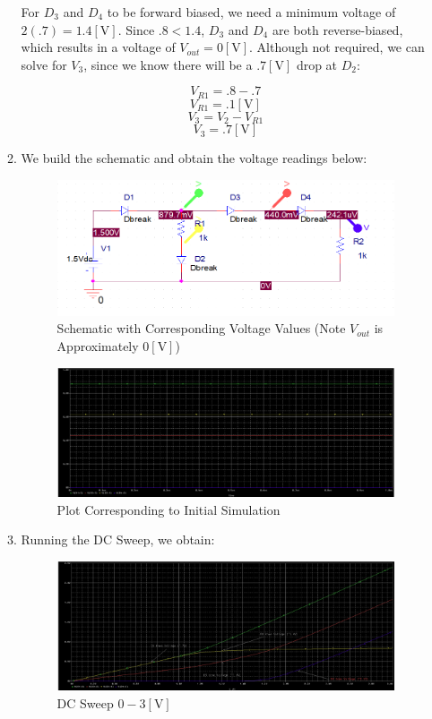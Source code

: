 \begin{enumerate}
\begin{enumerate}
        For $D_3$ and $D_4$ to be forward biased, we need a minimum voltage of $2(.7)=1.4[\si{\volt}]$. Since $.8<1.4$, $D_3$ and $D_4$ are both reverse-biased, which results in a voltage of $\boxed{V_{out}=0[\si{\volt}]}$. Although not required, we can solve for $V_3$, since we know there will be a $.7[\si{\volt}]$ drop at $D_2$:

        $$V_{R1}=.8-.7$$
        $$V_{R1}=.1[\si{\volt}]$$
        $$V_3=V_2-V_{R1}$$
        $$\boxed{V_3=.7[\si{\volt}]}$$

      \item We build the schematic and obtain the voltage readings below:

        \begin{figure}[H]
          \centering
          \includegraphics[width=.9\textwidth]{Figures/HW3Schem.png}
          \caption{Schematic with Corresponding Voltage Values (Note $V_{out}$ is Approximately $0[\si{\volt}]$)}
          \label{fig:4}
        \end{figure}

        \begin{figure}[H]
          \centering
          \includegraphics[width=.9\textwidth]{Figures/HW3-b.png}
          \caption{Plot Corresponding to Initial Simulation}
          \label{fig:5}
        \end{figure}

      \item Running the DC Sweep, we obtain:

        \begin{figure}[H]
          \centering
          \includegraphics[width=.9\textwidth]{Figures/HW3-c.png}
          \caption{DC Sweep $0-3[\si{\volt}]$}
          \label{fig:6}
        \end{figure}


\end{enumerate}
\end{enumerate}

